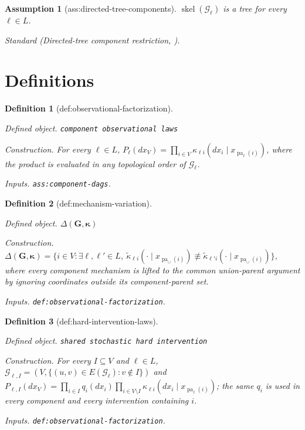 \documentclass{article}
\newtheorem{assumption}{Assumption}
\newtheorem{definition}{Definition}
\begin{document}
\begin{assumption}[ass:directed-tree-components]\label{ass:directed-tree-components}
\(\operatorname{skel}(\mathcal G_\ell)\) is a tree for every \(\ell\in L\).
\par\smallskip\noindent\emph{Standard} (Directed-tree component restriction, \cite{VariciKatzWeiSattigeriTajer2024Interventional}).
\end{assumption}

\section{Definitions}

\begin{definition}[def:observational-factorization]\label{def:observational-factorization}
\par\smallskip\noindent\emph{Defined object.} \texttt{component observational laws}
\par\smallskip\noindent\emph{Construction.} For every \(\ell\in L\), \(P_\ell(dx_V)=\prod_{i\in V}\kappa_{\ell i}(dx_i\mid x_{\operatorname{pa}_\ell(i)})\), where the product is evaluated in any topological order of \(\mathcal G_\ell\).
\par\smallskip\noindent\emph{Inputs.} \texttt{ass:\allowbreak{}component-\allowbreak{}dags}.
\end{definition}

\begin{definition}[def:mechanism-variation]\label{def:mechanism-variation}
\par\smallskip\noindent\emph{Defined object.} \(\Delta(\mathbf G,\boldsymbol\kappa)\)
\par\smallskip\noindent\emph{Construction.} \(\Delta(\mathbf G,\boldsymbol\kappa)=\{i\in V:\exists\ell,\ell'\in L,\ \widetilde\kappa_{\ell i}(\cdot\mid x_{\operatorname{pa}_{\cup}(i)})\not\equiv\widetilde\kappa_{\ell' i}(\cdot\mid x_{\operatorname{pa}_{\cup}(i)})\}\), where every component mechanism is lifted to the common union-parent argument by ignoring coordinates outside its component-parent set.
\par\smallskip\noindent\emph{Inputs.} \texttt{def:\allowbreak{}observational-\allowbreak{}factorization}.
\end{definition}

\begin{definition}[def:hard-intervention-laws]\label{def:hard-intervention-laws}
\par\smallskip\noindent\emph{Defined object.} \texttt{shared stochastic hard intervention}
\par\smallskip\noindent\emph{Construction.} For every \(I\subseteq V\) and \(\ell\in L\), \(\mathcal G_{\ell,I}=(V,\{(u,v)\in E(\mathcal G_\ell):v\notin I\})\) and \(P_{\ell,I}(dx_V)=\prod_{i\in I}q_i(dx_i)\prod_{i\in V\setminus I}\kappa_{\ell i}(dx_i\mid x_{\operatorname{pa}_\ell(i)})\); the same \(q_i\) is used in every component and every intervention containing \(i\).
\par\smallskip\noindent\emph{Inputs.} \texttt{def:\allowbreak{}observational-\allowbreak{}factorization}.
\end{definition}
\end{document}
